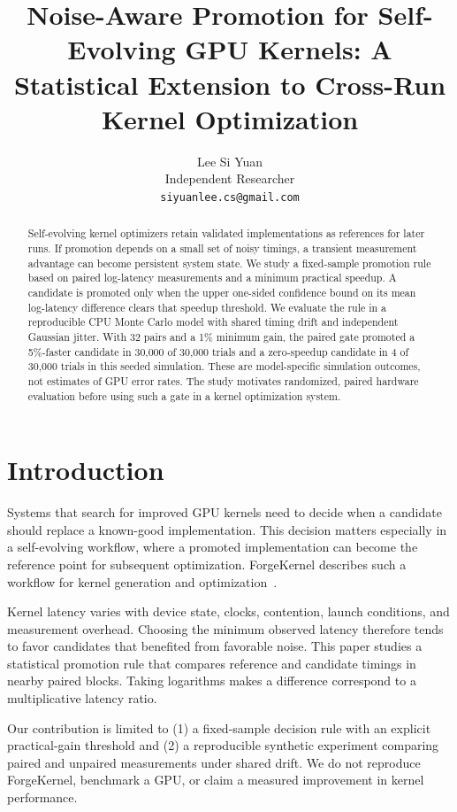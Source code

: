\documentclass[11pt]{article}
\title{Noise-Aware Promotion for Self-Evolving GPU Kernels: A Statistical Extension to Cross-Run Kernel Optimization}
\author{Lee Si Yuan \\
  Independent Researcher \\
  \texttt{siyuanlee.cs@gmail.com}}
\begin{document}
\maketitle

\begin{abstract}
Self-evolving kernel optimizers retain validated implementations as references for later runs. If promotion depends on a small set of noisy timings, a transient measurement advantage can become persistent system state. We study a fixed-sample promotion rule based on paired log-latency measurements and a minimum practical speedup. A candidate is promoted only when the upper one-sided confidence bound on its mean log-latency difference clears that speedup threshold. We evaluate the rule in a reproducible CPU Monte Carlo model with shared timing drift and independent Gaussian jitter. With 32 pairs and a 1\% minimum gain, the paired gate promoted a 5\%-faster candidate in 30,000 of 30,000 trials and a zero-speedup candidate in 4 of 30,000 trials in this seeded simulation. These are model-specific simulation outcomes, not estimates of GPU error rates. The study motivates randomized, paired hardware evaluation before using such a gate in a kernel optimization system.
\end{abstract}

\section{Introduction}
Systems that search for improved GPU kernels need to decide when a candidate should replace a known-good implementation. This decision matters especially in a self-evolving workflow, where a promoted implementation can become the reference point for subsequent optimization. ForgeKernel describes such a workflow for kernel generation and optimization~\cite{forgekernel}.

Kernel latency varies with device state, clocks, contention, launch conditions, and measurement overhead. Choosing the minimum observed latency therefore tends to favor candidates that benefited from favorable noise. This paper studies a statistical promotion rule that compares reference and candidate timings in nearby paired blocks. Taking logarithms makes a difference correspond to a multiplicative latency ratio.

Our contribution is limited to (1) a fixed-sample decision rule with an explicit practical-gain threshold and (2) a reproducible synthetic experiment comparing paired and unpaired measurements under shared drift. We do not reproduce ForgeKernel, benchmark a GPU, or claim a measured improvement in kernel performance.
\end{document}
